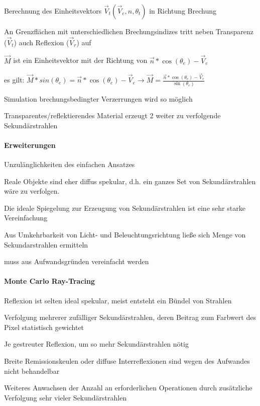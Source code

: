 \documentclass[landscape]{article}
\begin{document}
\begin{multicols}{3}
  Berechnung des Einheitsvektors $\vec{V}_t(\vec{V}_e,n,\theta_t)$ in Richtung Brechung
  \begin{itemize*}
    \item An Grenzflächen mit unterschiedlichen Brechungsindizes tritt neben Transparenz ($\vec{V}_t$) auch Reflexion ($\vec{V}_r$) auf
    \item $\vec{M}$ ist ein Einheitsvektor mit der Richtung von $\vec{n}*\cos(\theta_e)-\vec{V}_e$
    \item es gilt: $\vec{M}*sin(\theta_e)=\vec{n}*\cos(\theta_e)-\vec{V}_e \rightarrow \vec{M}=\frac{\vec{n}*\cos(\theta_e)-\vec{V}_e}{\sin(\theta_e)}$
    \item Simulation brechungsbedingter Verzerrungen wird so möglich
    \item Transparentes/reflektierendes Material erzeugt 2 weiter zu verfolgende Sekundärstrahlen
  \end{itemize*}
  
  \paragraph{Erweiterungen}
  Unzulänglichkeiten des einfachen Ansatzes
  \begin{itemize*}
    \item Reale Objekte sind eher diffus spekular, d.h. ein ganzes Set von Sekundärstrahlen wäre zu verfolgen.
    \item Die ideale Spiegelung zur Erzeugung von Sekundärstrahlen ist eine sehr starke Vereinfachung
    \item Aus Umkehrbarkeit von Licht- und Beleuchtungsrichtung ließe sich Menge von Sekundarstrahlen ermitteln
    \item muss aus Aufwandsgründen vereinfacht werden
  \end{itemize*}
  
  \paragraph{Monte Carlo Ray-Tracing}
  \begin{itemize*}
    \item Reflexion ist selten ideal spekular, meist entsteht ein Bündel von Strahlen
    \item Verfolgung mehrerer zufälliger Sekundärstrahlen, deren Beitrag zum Farbwert des Pixel statistisch gewichtet
    \item Je gestreuter Reflexion, um so mehr Sekundärstrahlen nötig
    \item Breite Remissionskeulen oder diffuse Interreflexionen sind wegen des Aufwandes nicht behandelbar
    \item Weiteres Anwachsen der Anzahl an erforderlichen Operationen durch zusätzliche Verfolgung sehr vieler Sekundärstrahlen
  \end{itemize*}
  

\end{multicols}
\end{document}

